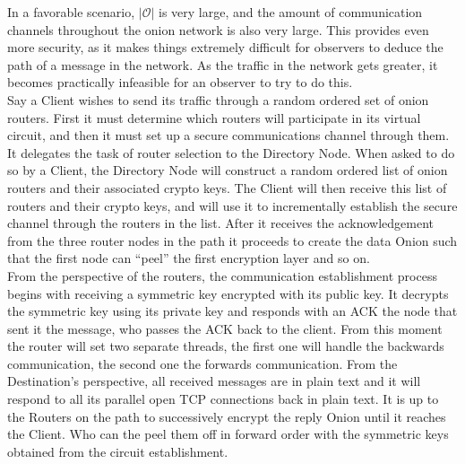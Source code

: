 \documentclass[10pt]{report}
\begin{document}
In a favorable scenario, $|\mathcal{O}|$ is very large, and the amount of communication channels
throughout the onion network is also very large. This provides even more security, as it makes
things extremely difficult for observers to deduce the path of a message in the network. As the
traffic in the network gets greater, it becomes practically infeasible for an observer to try to do
this.\\

\noindent Say a Client wishes to send its traffic through a random ordered set of onion routers.
First it must determine which routers will participate in its virtual circuit, and then it must set up a secure communications channel through them.
It delegates the task of router selection to the Directory Node.  When asked to do so by a Client, the Directory Node will construct a random ordered list of onion routers and their associated crypto keys.
The Client will then receive this list of routers and their crypto keys, and will use it to incrementally establish the secure channel through the routers in the list.
After it receives the acknowledgement from the three router nodes in the path it proceeds to create the data Onion such that the first node can “peel” the first encryption layer and so on.\\

\noindent From the perspective of the routers, the communication establishment process begins with receiving a symmetric key encrypted with its public key.
It decrypts the symmetric key using its private key and responds with an ACK the node that sent it the message, who passes the ACK back to the client.
From this moment the router will set two separate threads, the first one will handle the backwards communication, the second one the forwards communication.
From the Destination’s perspective, all received messages are in plain text and it will respond to all its parallel open TCP connections back in plain text.
It is up to the Routers on the path to successively encrypt the reply Onion until it reaches the Client. Who can the peel them off in forward order with the symmetric keys obtained from the circuit establishment.
\end{document}
